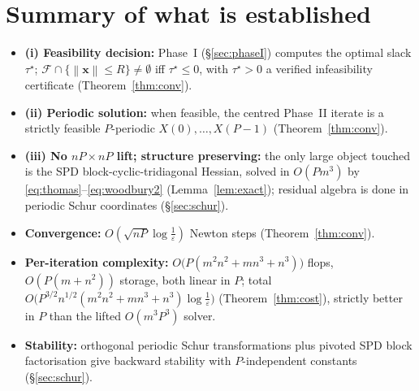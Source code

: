\documentclass{amsart}
\newcommand{\norm}[1]{\left\lVert#1\right\rVert}
\begin{document}
\section{Summary of what is established}\label{sec:summary}

\begin{itemize}
\item \textbf{(i) Feasibility decision:} Phase~I (\S\ref{sec:phaseI}) computes the
optimal slack $\tau^\star$; $\mathcal F\cap\{\norm{\bm x}\le R\}\neq\emptyset$ iff
$\tau^\star\le0$, with $\tau^\star>0$ a verified infeasibility certificate
(Theorem~\ref{thm:conv}).
\item \textbf{(ii) Periodic solution:} when feasible, the centred Phase~II iterate is
a strictly feasible $P$-periodic $X(0),\dots,X(P-1)$ (Theorem~\ref{thm:conv}).
\item \textbf{(iii) No $nP\times nP$ lift; structure preserving:} the only large
object touched is the SPD block-cyclic-tridiagonal Hessian, solved in $O(Pm^3)$ by
\eqref{eq:thomas}--\eqref{eq:woodbury2} (Lemma~\ref{lem:exact}); residual algebra is
done in periodic Schur coordinates (\S\ref{sec:schur}).
\item \textbf{Convergence:} $O(\sqrt{nP}\log\frac1\varepsilon)$ Newton steps
(Theorem~\ref{thm:conv}).
\item \textbf{Per-iteration complexity:} $O\!\big(P(m^2n^2+mn^3+n^3)\big)$ flops,
$O(P(m+n^2))$ storage, both linear in $P$; total
$O\!\big(P^{3/2}n^{1/2}(m^2n^2+mn^3+n^3)\log\frac1\varepsilon\big)$
(Theorem~\ref{thm:cost}), strictly better in $P$ than the lifted $O(m^3P^3)$ solver.
\item \textbf{Stability:} orthogonal periodic Schur transformations plus pivoted SPD
block factorisation give backward stability with $P$-independent constants
(\S\ref{sec:schur}).
\end{itemize}
\end{document}
